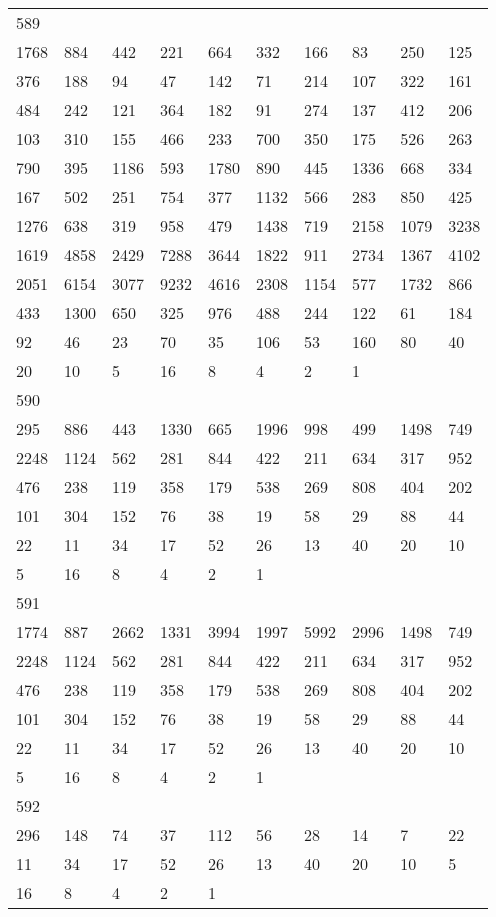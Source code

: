 \begin{longtable}{*{10}{l}}
589&&&&&&&&&\\
1768& 884& 442& 221& 664& 332& 166& 83& 250& 125\\
376& 188& 94& 47& 142& 71& 214& 107& 322& 161\\
484& 242& 121& 364& 182& 91& 274& 137& 412& 206\\
103& 310& 155& 466& 233& 700& 350& 175& 526& 263\\
790& 395& 1186& 593& 1780& 890& 445& 1336& 668& 334\\
167& 502& 251& 754& 377& 1132& 566& 283& 850& 425\\
1276& 638& 319& 958& 479& 1438& 719& 2158& 1079& 3238\\
1619& 4858& 2429& 7288& 3644& 1822& 911& 2734& 1367& 4102\\
2051& 6154& 3077& 9232& 4616& 2308& 1154& 577& 1732& 866\\
433& 1300& 650& 325& 976& 488& 244& 122& 61& 184\\
92& 46& 23& 70& 35& 106& 53& 160& 80& 40\\
20& 10& 5& 16& 8& 4& 2& 1& \\

590&&&&&&&&&\\
295& 886& 443& 1330& 665& 1996& 998& 499& 1498& 749\\
2248& 1124& 562& 281& 844& 422& 211& 634& 317& 952\\
476& 238& 119& 358& 179& 538& 269& 808& 404& 202\\
101& 304& 152& 76& 38& 19& 58& 29& 88& 44\\
22& 11& 34& 17& 52& 26& 13& 40& 20& 10\\
5& 16& 8& 4& 2& 1& \\

591&&&&&&&&&\\
1774& 887& 2662& 1331& 3994& 1997& 5992& 2996& 1498& 749\\
2248& 1124& 562& 281& 844& 422& 211& 634& 317& 952\\
476& 238& 119& 358& 179& 538& 269& 808& 404& 202\\
101& 304& 152& 76& 38& 19& 58& 29& 88& 44\\
22& 11& 34& 17& 52& 26& 13& 40& 20& 10\\
5& 16& 8& 4& 2& 1& \\

592&&&&&&&&&\\
296& 148& 74& 37& 112& 56& 28& 14& 7& 22\\
11& 34& 17& 52& 26& 13& 40& 20& 10& 5\\
16& 8& 4& 2& 1& \\


\end{longtable}
